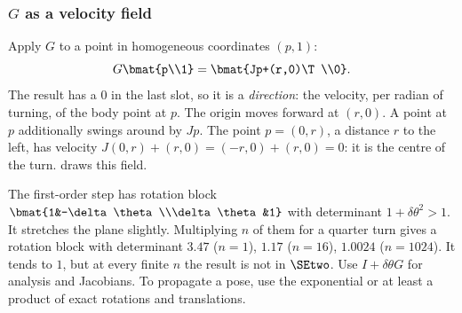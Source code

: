 \subsubsection{$G$ as a velocity field}
Apply $G$ to a point in homogeneous coordinates $(p,1)$:
\begin{equation}
G\bmat{p\\1}=\bmat{Jp+(r,0)\T\\0}.\label{eq:pl:velocity-field}
\end{equation}
The result has a $0$ in the last slot, so it is a \emph{direction}: the velocity, per radian of turning, of the body point at $p$. The origin moves forward at $(r,0)$. A point at $p$ additionally swings around by $Jp$. The point $p=(0,r)$, a distance $r$ to the left, has velocity $J(0,r)+(r,0)=(-r,0)+(r,0)=0$: it is the centre of the turn.  draws this field.

\begin{pitfall}
The first-order step has rotation block $\bmat{1&-\delta\theta\\\delta\theta&1}$ with determinant $1+\delta\theta^2>1$. It stretches the plane slightly. Multiplying $n$ of them for a quarter turn gives a rotation block with determinant $3.47$ ($n=1$), $1.17$ ($n=16$), $1.0024$ ($n=1024$). It tends to $1$, but at every finite $n$ the result is not in $\SEtwo$. Use $I+\delta\theta G$ for analysis and Jacobians. To propagate a pose, use the exponential or at least a product of exact rotations and translations.
\end{pitfall}
